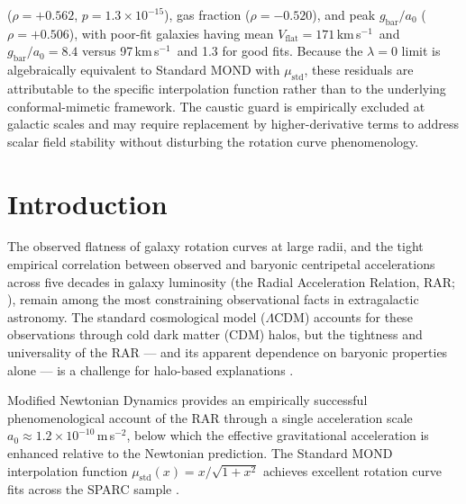 \documentclass{aa}
\newcommand{\kms}{km\,s$^{-1}$}
\newcommand{\mstd}{\mu_\text{std}}
\newcommand{\gbar}{g_\text{bar}}
\newcommand{\azero}{a_0}
\begin{document}
{($\rho = +0.562$, $p = 1.3 \times 10^{-15}$), gas fraction
($\rho = -0.520$), and peak $\gbar/\azero$ ($\rho = +0.506$), with
poor-fit galaxies having mean $V_\text{flat} = 171$\,\kms\ and
$\gbar/\azero = 8.4$ versus 97\,\kms\ and 1.3 for good fits. Because the
$\lambda = 0$ limit is algebraically equivalent to Standard MOND with
$\mstd$, these residuals are attributable to the specific interpolation
function rather than to the underlying conformal-mimetic framework. The
caustic guard is empirically excluded at galactic scales and may require
replacement by higher-derivative terms to address scalar field stability
without disturbing the rotation curve phenomenology.
}

\maketitle

\section{Introduction}
\label{sec:intro}

The observed flatness of galaxy rotation curves at large radii, and the tight
empirical correlation between observed and baryonic centripetal accelerations
across five decades in galaxy luminosity (the Radial Acceleration Relation,
RAR; \citealt{McGaugh2016}), remain among the most constraining observational
facts in extragalactic astronomy. The standard cosmological model ($\Lambda$CDM)
accounts for these observations through cold dark matter (CDM) halos, but the
tightness and universality of the RAR --- and its apparent dependence on
baryonic properties alone --- is a challenge for halo-based explanations
\citep{Desmond2019,Keller2017}.

Modified Newtonian Dynamics \citep[MOND;][]{Milgrom1983} provides an
empirically successful phenomenological account of the RAR through a single
acceleration scale $\azero \approx 1.2 \times 10^{-10}$\,m\,s$^{-2}$, below
which the effective gravitational acceleration is enhanced relative to the
Newtonian prediction. The Standard MOND interpolation function
$\mstd(x) = x/\sqrt{1+x^2}$ achieves excellent rotation curve fits across
the SPARC sample \citep{Li2018,Lelli2017}.
\end{document}
